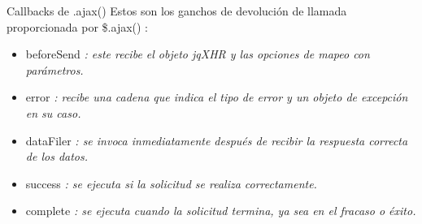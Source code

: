\begin{frame}[fragile]{Callbacks de .ajax()} %
Estos son los ganchos de devolución de llamada proporcionada por \$.ajax() :
\begin{itemize}
\item beforeSend \textit{ : este recibe el objeto jqXHR y las opciones de mapeo
con parámetros.} 
\item error \textit { : recibe una cadena que indica el tipo de error y un objeto de excepción en su caso.}
\item dataFiler \textit{ : se invoca inmediatamente después de recibir la respuesta correcta de los datos.}
\item success \textit{ : se ejecuta si la solicitud se realiza correctamente.}
\item complete \textit{ : se ejecuta cuando la solicitud termina, ya sea en el
fracaso o éxito.}
\end{itemize}
\end{frame}

